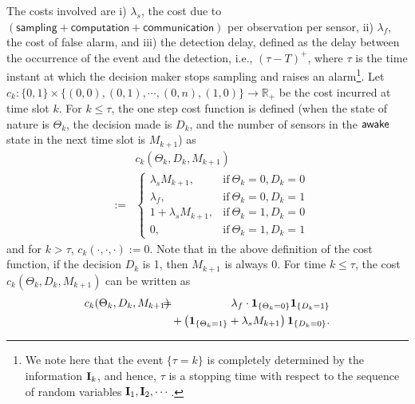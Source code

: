 \documentclass[journal]{IEEEtran}
\newcommand{\wake}{{${\sf awake }$}}
\begin{document}
The costs involved are i) $\lambda_s$, the cost due to
$\mathsf{(sampling + computation + communication)}$ per observation per
sensor, ii) $\lambda_f$, the cost of false alarm, and iii) the detection
delay, defined as the delay between the occurrence of the event and the
detection, i.e., $(\tau-T)^+$, where $\tau$ is the time instant at which
the decision maker {\sf stop}s sampling and raises an alarm\footnote{We
note here that the event $\{\tau=k\}$ is completely determined by the
information ${\bf I}_k$, and hence, $\tau$ is a stopping time with
respect to the sequence of random variables ${\bf I}_1, {\bf I}_2,
\cdots$.}. Let $c_k:\{0,1\}\times\{(0,0), (0,1), \cdots, (0,n),
(1,0)\}\to {\mathbb R}_+$ be the cost incurred at time slot $k$.  For $k
\leqslant \tau$, the one step cost function is defined (when the state
of nature is $\Theta_k$, the decision made is $D_k$, and the number of
sensors in the {\wake} state in the next time slot is $M_{k+1}$) as 
\begin{eqnarray}
& & c_k(\Theta_k,D_k,M_{k+1}) \nonumber \\
& := & 
    \left\{
    \begin{array}{ll}
	\lambda_s M_{k+1},       & \text{if} \ \Theta_k=0, D_k=0\\
	\lambda_f,         & \text{if} \ \Theta_k=0, D_k=1\\
	1+\lambda_s M_{k+1},     & \text{if} \ \Theta_k=1, D_k=0\\
	0,                 & \text{if} \ \Theta_k=1, D_k=1
    \end{array} 
	\right.
\end{eqnarray}
and for $k > \tau$, $c_k(\cdot,\cdot,\cdot) := 0$. Note that in the
above definition of the cost function, if the decision $D_k$ is 1, then
$M_{k+1}$ is always 0. For time $k \leqslant \tau$, the cost
$c_k(\Theta_k,D_k,M_{k+1})$ can be written as
\begin{eqnarray}
\label{eqn:general_cost_fn}
c_k(\Theta_k,D_k,M_{k+1}) 
\hspace{-3mm} & = & \hspace{-2mm} \lambda_f \cdot {\bf 1}_{\{\Theta_k = 0\}}  {\bf 1}_{\{D_k = 1\}} \nonumber \\
& & \hspace{-3mm}+ \left( {\bf 1}_{\{\Theta_k = 1\}} + \lambda_s M_{k+1} \right)  {\bf 1}_{\{D_k = 0\}}.
\end{eqnarray}
\end{document}
